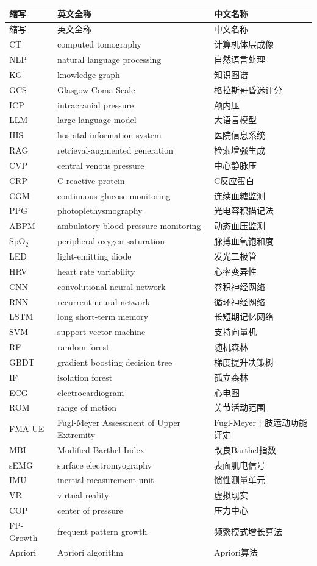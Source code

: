 \begin{center}
\small
\renewcommand{\arraystretch}{1.18}
\begin{longtable}{p{}p{}p{}}
\toprule
缩写 & 英文全称 & 中文名称\\
\midrule
\endfirsthead
\toprule
缩写 & 英文全称 & 中文名称\\
\midrule
\endhead
CT & computed tomography & 计算机体层成像\\
NLP & natural language processing & 自然语言处理\\
KG & knowledge graph & 知识图谱\\
GCS & Glasgow Coma Scale & 格拉斯哥昏迷评分\\
ICP & intracranial pressure & 颅内压\\
LLM & large language model & 大语言模型\\
HIS & hospital information system & 医院信息系统\\
RAG & retrieval-augmented generation & 检索增强生成\\
CVP & central venous pressure & 中心静脉压\\
CRP & C-reactive protein & C反应蛋白\\
CGM & continuous glucose monitoring & 连续血糖监测\\
PPG & photoplethysmography & 光电容积描记法\\
ABPM & ambulatory blood pressure monitoring & 动态血压监测\\
SpO$_2$ & peripheral oxygen saturation & 脉搏血氧饱和度\\
LED & light-emitting diode & 发光二极管\\
HRV & heart rate variability & 心率变异性\\
CNN & convolutional neural network & 卷积神经网络\\
RNN & recurrent neural network & 循环神经网络\\
LSTM & long short-term memory & 长短期记忆网络\\
SVM & support vector machine & 支持向量机\\
RF & random forest & 随机森林\\
GBDT & gradient boosting decision tree & 梯度提升决策树\\
IF & isolation forest & 孤立森林\\
ECG & electrocardiogram & 心电图\\
ROM & range of motion & 关节活动范围\\
FMA-UE & Fugl-Meyer Assessment of Upper Extremity & Fugl-Meyer上肢运动功能评定\\
MBI & Modified Barthel Index & 改良Barthel指数\\
sEMG & surface electromyography & 表面肌电信号\\
IMU & inertial measurement unit & 惯性测量单元\\
VR & virtual reality & 虚拟现实\\
COP & center of pressure & 压力中心\\
FP-Growth & frequent pattern growth & 频繁模式增长算法\\
Apriori & Apriori algorithm & Apriori算法\\
\bottomrule
\end{longtable}
\end{center}
